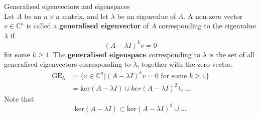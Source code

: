 \documentclass[journal, letterpaper]{IEEEtran}
\begin{document}
    \begin{mybox}{Generalised eigenvectors and eigenspaces} \\ 
        Let $A$ be an $n\times n$ matrix, and let $\lambda$ be an eigenvalue of $A$. A non-zero vector $v \in \mathbb{C}^n$ is called a \textbf{generalised eigenvector} of $A$ corresponding to the eigenvalue $\lambda$ if
        $$ (A - \lambda I)^k v = 0$$
        for some $k \ge 1$. The \textbf{generalised eigenspace} corresponding to $\lambda$ is the set of all generalised eigenvectors corresponding to $\lambda$, together with the zero vector.
        \begin{align*}
            \text{GE}_\lambda &= \{v \in \mathbb{C}^n \vert (A - \lambda I)^k v = 0 \text{ for some } k \ge 1 \} \\ 
            &= \text{ker}(A - \lambda I) \cup ker(A - \lambda I)^2 \cup \dots
        \end{align*}
        Note that 
        $$ \text{ker}(A - \lambda I) \subset \text{ker}(A - \lambda I)^2 \cup \dots$$ 
    \end{mybox}
\end{document}
